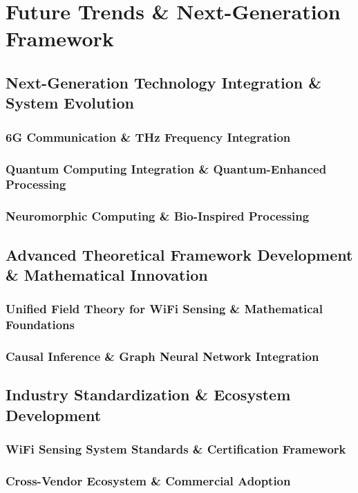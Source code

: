 \documentclass[journal]{IEEEtran}
\begin{document}
\section{Future Trends \& Next-Generation Framework}
\label{sec:future}

\subsection{Next-Generation Technology Integration \& System Evolution}
\subsubsection{6G Communication \& THz Frequency Integration}
\subsubsection{Quantum Computing Integration \& Quantum-Enhanced Processing}
\subsubsection{Neuromorphic Computing \& Bio-Inspired Processing}

\subsection{Advanced Theoretical Framework Development \& Mathematical Innovation}
\subsubsection{Unified Field Theory for WiFi Sensing \& Mathematical Foundations}
\subsubsection{Causal Inference \& Graph Neural Network Integration}

\subsection{Industry Standardization \& Ecosystem Development}
\subsubsection{WiFi Sensing System Standards \& Certification Framework}
\subsubsection{Cross-Vendor Ecosystem \& Commercial Adoption}
\end{document}
